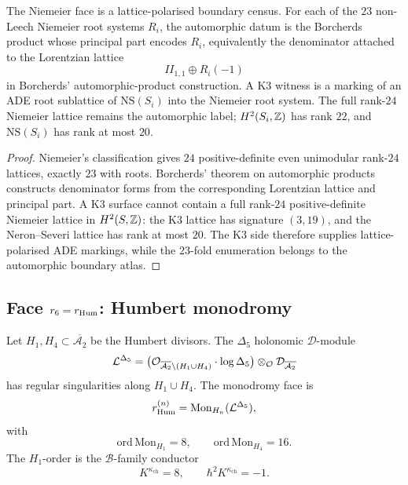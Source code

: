 \begin{proposition}[$r_{\Niem}$]
\label{wn:prop:r5-Niemeier-witness}
The Niemeier face is a lattice-polarised boundary census.  For each of
the \(23\) non-Leech Niemeier root systems \(R_i\), the automorphic datum
is the Borcherds product whose principal part encodes \(R_i\), equivalently
the denominator attached to the Lorentzian lattice
\[
  II_{1,1}\oplus R_i(-1)
\]
in Borcherds' automorphic-product construction.  A K3 witness is a
marking of an ADE root sublattice of \(\mathrm{NS}(S_i)\) into the
Niemeier root system.  The full rank-\(24\) Niemeier lattice remains the
automorphic label; \(H^2(S_i,\mathbb{Z})\) has rank \(22\), and
\(\mathrm{NS}(S_i)\) has rank at most \(20\).
\end{proposition}

\begin{proof}
Niemeier's classification gives \(24\) positive-definite even unimodular
rank-\(24\) lattices, exactly \(23\) with roots.  Borcherds' theorem on
automorphic products constructs denominator forms from the corresponding
Lorentzian lattice and principal part.  A K3 surface cannot contain a
full rank-\(24\) positive-definite Niemeier lattice in \(H^2(S,\mathbb{Z})\):
the K3 lattice has signature \((3,19)\), and the Neron--Severi lattice
has rank at most \(20\).  The K3 side therefore supplies lattice-polarised
ADE markings, while the \(23\)-fold enumeration belongs to the
automorphic boundary atlas.
\end{proof}

\subsection{Face $r_6=r_{\mathrm{Hum}}$: Humbert monodromy}
\label{wn:subsec:r6-Humbert}

\begin{proposition}[$r_{\Hum}$]
\label{wn:prop:r6-Humbert-witness}
Let \(H_1,H_4\subset\overline{\mathcal A_2}\) be the Humbert divisors.
The \(\Delta_5\) holonomic \(\mathcal D\)-module
\[
  \mathcal{L}^{\Delta_5}
  =
  \bigl(\mathcal{O}_{\overline{\mathcal A_2}\setminus(H_1\cup H_4)}
  \cdot\log\Delta_5\bigr)\otimes_{\mathcal{O}}\mathcal D_{\overline{\mathcal A_2}}
\]
has regular singularities along \(H_1\cup H_4\).  The monodromy face is
\[
  r_{\mathrm{Hum}}^{(n)}
  =
  \mathrm{Mon}_{H_n}(\mathcal{L}^{\Delta_5}),
\]
with
\[
  \mathrm{ord}\,\mathrm{Mon}_{H_1}=8,\qquad
  \mathrm{ord}\,\mathrm{Mon}_{H_4}=16.
\]
The \(H_1\)-order is the \(\mathcal B\)-family conductor
\[
  K^{\kappa_{\mathrm{ch}}}=8,\qquad
  \hbar^2 K^{\kappa_{\mathrm{ch}}}=-1.
\]
\end{proposition}

